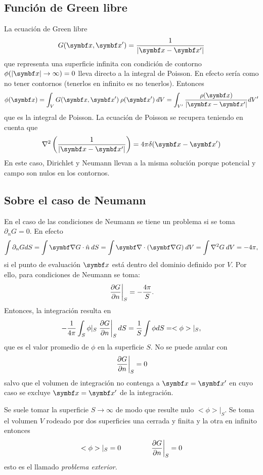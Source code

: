 \documentclass[10pt,oneside]{CBFT_book}
\begin{document}
\subsection{Función de Green libre}

La ecuación de Green libre
\[
	G(\vb{x}, \vb{x}') = \frac{1}{|\vb{x} - \vb{x}'|}
\]
que representa una superficie infinita con condición de contorno $\phi(|\vbx| \to \infty) = 0 $
lleva directo a la integral de Poisson. En efecto sería como no tener contornos (tenerlos en
infinito es no tenerlos).
Entonces 
\[
	\phi(\vb{x}) = \int_V G(\vbx,\vbx') \: \rho(\vbx') \:dV = 
	\int_{V'} \frac{ \rho(\vb{x}) }{|\vb{x}-\vb{x}'|} dV'
\]
que es la integral de Poisson. La ecuación de Poisson se recupera teniendo en cuenta
que
\[
	\nabla^2 \left( \frac{1}{|\vb{x} - \vb{x}'|} \right) = 4\pi \delta(\vb{x}-\vb{x}')
\]
En este caso, Dirichlet y Neumann llevan a la misma solución porque potencial y campo son
nulos en los contornos.

\subsection{Sobre el caso de Neumann}

En el caso de las condiciones de Neumann se tiene un problema si se toma
$\partial_n G = 0$. En efecto
\[
	\int \partial_n G dS = \int \Nabla G \cdot \hat{n} \: dS = 
	\int \Nabla\cdot(\Nabla G) \: dV = \int \nabla^2 G \: dV = - 4 \pi,
\]
si el punto de evaluación $\vbx$ está dentro del dominio definido por $V$.
Por ello, para condiciones de Neumann se toma:
\[
	\left. \frac{\partial^{\hspace{-0.05em}} {G}}{\partial {n}^{\hspace{-0.05em}}} \right|_S = -\frac{4\pi}{S}.
\]
Entonces, la integración resulta en
\[
	- \frac{1}{4\pi} \int_S \phi|_S \left.\frac{\partial^{\hspace{-0.05em}} {G}}{\partial {n}^{\hspace{-0.05em}}}\right|_S dS =
	\frac{1}{S} \int \phi dS = <\phi>|_S,
\]
que es el valor promedio de $\phi$ en la superficie $S$.
No se puede anular con 
\[
	\left.\frac{\partial^{\hspace{-0.05em}} {G}}{\partial {n}^{\hspace{-0.05em}}}\right|_S = 0
\]
salvo que el volumen de integración no contenga a $\vb{x}=\vb{x}'$ en cuyo caso
se excluye $\vb{x}=\vb{x}'$ de la integración.

Se suele tomar la superficie $S \to \infty$ de modo que resulte nulo $<\phi>|_S$.
Se toma el volumen $V$ rodeado por dos superficies una cerrada y finita y la otra
en infinito entonces
\[
	<\phi>|_S = 0 \qquad \qquad \left. \frac{\partial^{\hspace{-0.05em}} {G}}{\partial {n}^{\hspace{-0.05em}}}\right|_S = 0
\]
esto es el llamado {\it problema exterior}.
\end{document}
